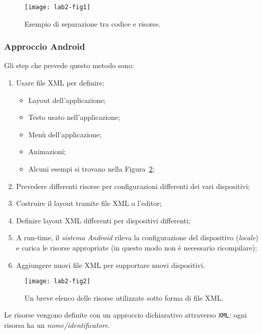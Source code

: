 \begin{figure}[htbp]
        \centering
        \texttt{[image: lab2-fig1]}
        \caption[Esempio di separazione tra codice e risorse]{Esempio di
separazione tra codice e risorse.}\label{img:lab2-fig1}
\end{figure}

\subsubsection{Approccio Android}

Gli step che prevede questo metodo sono:

\begin{enumerate}
\item Usare file XML per definire;
\begin{itemize}
\item Layout dell'applicazione;
\item Testo usato nell'applicazione;
\item Menù dell'applicazione;
\item Animazioni;
\item Alcuni esempi si trovano nella Figura~\ref{img:lab2-fig2};
\end{itemize}
\item Prevedere differenti risorse per configurazioni differenti dei vari
dispositivi;
\item Costruire il layout tramite file XML o l'editor;
\item Definire layout XML differenti per dispositivi differenti;
\item A run-time, il \textit{sistema Android} rileva la configurazione del
dispositivo (\textit{locale}) e carica le risorse appropriate (in questo modo
non è necessario ricompilare);
\item Aggiungere nuovi file XML per supportare nuovi dispositivi.
\end{enumerate}

\begin{figure}[htbp]
        \centering
        \texttt{[image: lab2-fig2]}
        \caption[Elenco risorse]{Un breve elenco delle risorse utilizzate sotto
forma di file XML.}\label{img:lab2-fig2}
\end{figure}

Le risorse vengono definite con un approccio dichiarativo attraverso
\texttt{XML}: ogni risorsa ha un \textit{nome/identificatore}.



